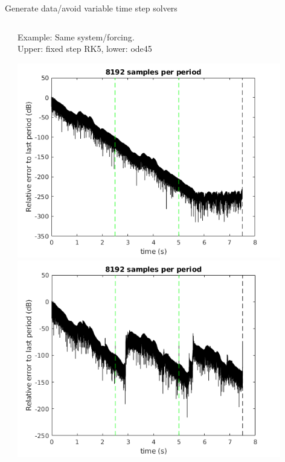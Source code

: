 \documentclass[9pt]{beamer}
\begin{document}
\begin{frame}{Generate data/avoid variable time step solvers}
\begin{columns}
\begin{column}{0.5\textwidth}
    \end{column}
    \begin{column}{0.5\textwidth}  %
      Example: Same system/forcing.\\ Upper: fixed step RK5, lower: ode45
      \begin{center}
        \includegraphics[width=0.9\textwidth]{fig/periodicity_ode5}
        \includegraphics[width=0.9\textwidth]{fig/periodicity_ode45}
      \end{center}
    \end{column}
  \end{columns}
\end{frame}
\end{document}
